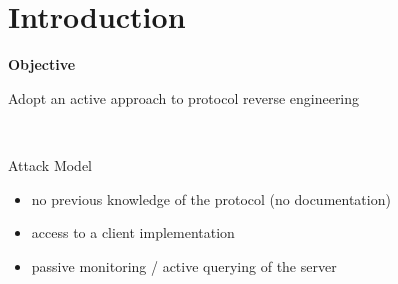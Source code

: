 \documentclass{beamer}
\newcounter{m} %
\newcounter{c} %
\begin{document}
\begin{frame}

\end{frame}


\section{Introduction}

\begin{frame}{\bf Objective}

  Adopt an active approach to protocol reverse engineering

  ~

  \begin{block}{Attack Model}
    \begin{itemize}
      \item no previous knowledge of the protocol (no documentation)
      \item access to a client implementation
      \item passive monitoring / active querying of the server
    \end{itemize}
  \end{block}

\end{frame}
\end{document}
